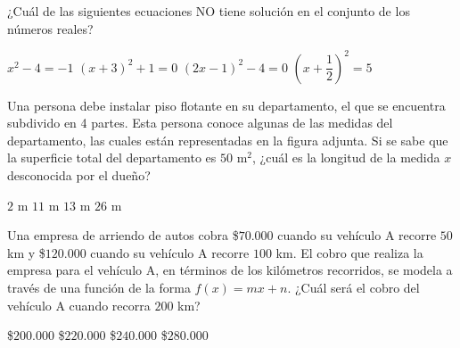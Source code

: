 \documentclass[borrador]{srs3}
\begin{document}
\begin{preguntas}
\pregunta ¿Cuál de las siguientes ecuaciones NO tiene solución en el conjunto de los números reales?
\begin{alternativas}
\alternativa \( x^2-4=-1 \)
\alternativa \( \left(x+3\right)^2+1=0 \)
\alternativa \( \left(2x-1\right)^2-4=0 \)
\alternativa \( \left(x+\dfrac{1}{2}\right)^2=5 \)
\end{alternativas}
\pregunta Una persona debe instalar piso flotante en su departamento, el que se encuentra subdivido en 4 partes. Esta persona conoce algunas de las medidas del departamento, las cuales están representadas en la figura adjunta. Si se sabe que la superficie total del departamento es \(50\) m\(^2\), ¿cuál es la longitud de la medida \(x\) desconocida por el dueño?
\begin{columnas}[0.4][t]
\begin{alternativas}
\alternativa \(2\) m
\alternativa \(11\) m
\alternativa \(13\) m
\alternativa \(26\) m
\end{alternativas}
\siguiente
{}
\end{columnas}
\pregunta Una empresa de arriendo de autos cobra \$$70.000$ cuando su vehículo A recorre \(50\) km y \$$120.000$ cuando su vehículo A recorre \(100\) km. El cobro que realiza la empresa para el vehículo A, en términos de los kilómetros recorridos, se modela a través de una función de la forma \(f\left(x\right)=mx+n\). ¿Cuál será el cobro del vehículo A cuando recorra \(200\) km?
\begin{alternativas}
\alternativa \$$200.000$
\alternativa \$$220.000$
\alternativa \$$240.000$
\alternativa \$$280.000$
\end{alternativas}


\end{preguntas}
\end{document}
